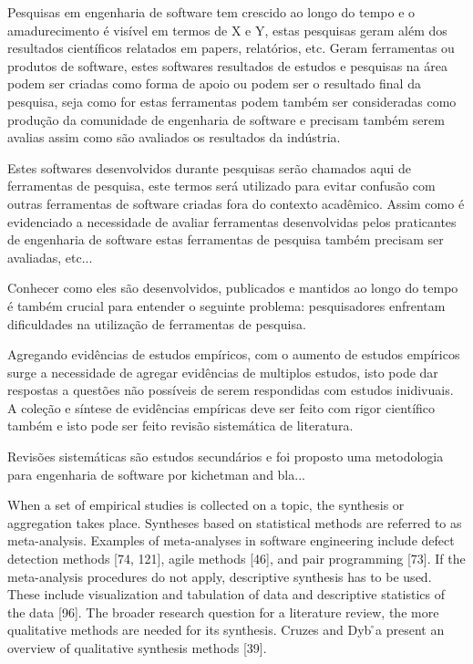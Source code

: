 \documentclass[12pt]{article}
\begin{document}
Pesquisas em engenharia de software tem crescido ao longo do tempo e o
amadurecimento é visível em termos de X e Y, estas pesquisas geram além dos
resultados científicos relatados em papers, relatórios, etc. Geram ferramentas
ou produtos de software, estes softwares resultados de estudos e pesquisas na
área podem ser criadas como forma de apoio ou podem ser o resultado final da
pesquisa, seja como for estas ferramentas podem também ser consideradas como
produção da comunidade de engenharia de software e precisam também serem
avalias assim como são avaliados os resultados da indústria.

Estes softwares desenvolvidos durante pesquisas serão chamados aqui de
ferramentas de pesquisa, este termos será utilizado para evitar confusão com
outras ferramentas de software criadas fora do contexto acadêmico. Assim como
é evidenciado a necessidade de avaliar ferramentas desenvolvidas pelos
praticantes de engenharia de software estas ferramentas de pesquisa também
precisam ser avaliadas, etc...

Conhecer como eles são desenvolvidos, publicados e mantidos ao longo do tempo
é também crucial para entender o seguinte problema: pesquisadores enfrentam
dificuldades na utilização de ferramentas de pesquisa.

Agregando evidências de estudos empíricos, com o aumento de estudos empíricos
surge a necessidade de agregar evidências de multiplos estudos, isto pode dar
respostas a questões não possíveis de serem respondidas com estudos
inidivuais. A coleção e síntese de evidências empíricas deve ser feito com
rigor científico também e isto pode ser feito revisão sistemática de
literatura.

Revisões sistemáticas são estudos secundários e foi proposto uma metodologia
para engenharia de software por kichetman and bla... 

When a set of empirical studies is collected on a topic, the synthesis or
aggregation takes place. Syntheses based on statistical methods are referred to as
meta-analysis. Examples of meta-analyses in software engineering include defect
detection methods [74, 121], agile methods [46], and pair programming [73].
If the meta-analysis procedures do not apply, descriptive synthesis has to be used.
These include visualization and tabulation of data and descriptive statistics of the
data [96]. The broader research question for a literature review, the more qualitative
methods are needed for its synthesis. Cruzes and Dyb ̊a present an overview of
qualitative synthesis methods [39].


\end{document}
